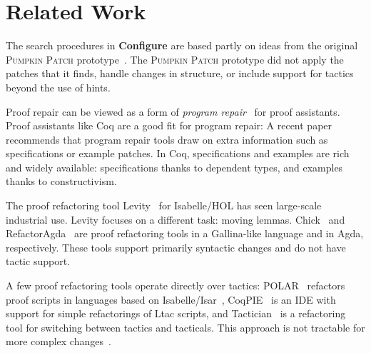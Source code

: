\section{Related Work}
\label{sec:related}


The search procedures in \textbf{Configure} are based partly on ideas from the original \textsc{Pumpkin Patch} prototype~\cite{pumpkinpatch}.
The \textsc{Pumpkin Patch} prototype did not apply the patches that it finds,
handle changes in structure, or include support for tactics beyond the use of hints.

Proof repair can be viewed as a form of \textit{program repair}~\cite{Monperrus:2018:ASR:3177787.3105906, Gazzola:2018:ASR:3180155.3182526}
for proof assistants.
Proof assistants like Coq are a good fit for program repair: A recent paper~\cite{Qi:2015:APP:2771783.2771791} 
recommends that program repair tools draw on extra information
such as specifications or example patches. In Coq, specifications and examples 
are rich and widely available: specifications thanks to dependent types,
and examples thanks to constructivism.

The proof refactoring tool Levity~\cite{Bourke12} for Isabelle/HOL has seen large-scale industrial use.
Levity focuses on a different task: moving lemmas.
Chick~\cite{robert2018} and RefactorAgda~\cite{wibergh2019} are proof refactoring tools
in a Gallina-like language and in Agda, respectively.
These tools support primarily syntactic changes and do not have tactic support.

A few proof refactoring tools operate directly over tactics:
POLAR~\cite{Dietrich2013} refactors proof scripts in languages based on Isabelle/Isar~\cite{Wenzel2007isar},
CoqPIE~\cite{Roe2016} is an IDE with support for simple refactorings of Ltac scripts, and
Tactician~\cite{adams2015} is a refactoring tool for switching between tactics and tacticals.
This approach is not tractable for more complex changes~\cite{robert2018}.

